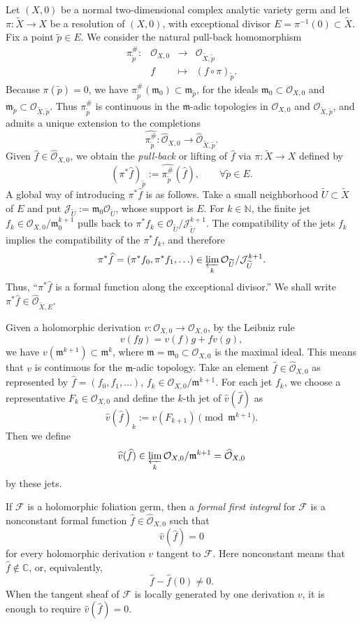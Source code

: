 \documentclass[11pt,twoside]{amsart}
\newcommand{\OO}{\mathcal O}
\newcommand{\FF}{\mathcal F}
\newcommand{\mm}{\mathfrak m}
\newcommand{\wh}{\widehat}
\newcommand{\wt}{\widetilde}
\newcommand{\CC}{\mathbb C}
\newcommand{\NN}{\mathbb N}
\theoremstyle{definition}
\begin{document}
Let $(X,0)$ be a normal two-dimensional complex analytic variety germ and let $\pi\colon\wt X\to X$ be a resolution of $(X,0)$, with exceptional divisor $E=\pi^{-1}(0)\subset\wt X$. Fix a point $\wt p\in E$. We consider the natural pull-back homomorphism
\[\begin{array}{cccc}
  \pi_{\wt p}^{\#}\colon&\OO_{X,0}&\to& \OO_{\wt X,\wt p}\\
   &f&\mapsto & (f\circ\pi)_{\wt p}.\end{array}
\]
Because $\pi(\wt p)=0$, we have $\pi_{\wt p}^{\#}(\mm_0)\subset \mm_{\wt p}$, for the ideals $\mm_0\subset\OO_{X,0}$ and $\mm_{\wt p}\subset\OO_{\wt X,\wt p}$. Thus $\pi_{\wt p}^{\#}$ is continuous in the $\mm$-adic topologies in $\OO_{X,0}$ and $\OO_{\wt X,\wt p}$, and admits a unique extension to the completions
\[
  \widehat{\pi_{\wt p}^{\#}}\colon
  \widehat{\OO}_{X,0}\to \widehat{\OO}_{\wt X,\wt p}.
\]
Given $\wh f\in\widehat{\OO}_{X,0}$, we obtain the \textit{pull-back} or lifting of $\wh f$ via $\pi\colon\wt X\to X$ defined by
\[
  (\pi^*\wh f)_{\wt p}:=\widehat{\pi_{\wt p}^{\#}}(\wh f),
  \qquad \forall\wt p\in E.
\]
A global way of introducing $\pi^*\wh f$ is as follows. Take a small
neighborhood $\wt U\subset\wt X$ of $E$ and put
$\mathcal J_{\wt U}:=\mm_0\OO_{\wt U}$, whose support is $E$. For
$k\in\NN$, the finite jet
$f_k\in \OO_{X,0}/\mm_0^{k+1}$ pulls back to
$\pi^*f_k\in \OO_{\wt U}/\mathcal J_{\wt U}^{k+1}$.
The compatibility of the jets $f_k$ implies the compatibility of the $\pi^*f_k$, and therefore
\[
  \pi^*\wh f=(\pi^*f_0,\pi^*f_1,\ldots)
  \in \varprojlim_k \OO_{\wt U}/\mathcal J_{\wt U}^{k+1}.
\]
Thus, ``$\pi^*\wh f$ is a formal function along the exceptional divisor.'' We shall write $\pi^*\wh f\in\widehat{\OO}_{\wt X,E}$.

Given a holomorphic derivation $v\colon\OO_{X,0}\to\OO_{X,0}$, by the Leibniz rule
\[
  v(fg)=v(f)g+f v(g),
\]
we have $v(\mm^{k+1})\subset \mm^k$,
where $\mm=\mm_0\subset\OO_{X,0}$ is the maximal ideal. This means that $v$ is continuous for the $\mm$-adic topology. Take an element $\wh f\in\widehat{\OO}_{X,0}$ as represented by
$\wh f=(f_0,f_1,\ldots)$,
   $f_k\in\OO_{X,0}/\mm^{k+1}$. For each jet $f_k$, we choose a representative $F_k\in\OO_{X,0}$ and define the $k$-th jet of $\widehat v(\wh f)$ as
\[
  \widehat v(\wh f)_k:=v(F_{k+1})\pmod{\mm^{k+1}}.
\]
Then we define
\[
  \widehat v(\wh f)\in \varprojlim_k \OO_{X,0}/\mm^{k+1}
  =\widehat{\OO}_{X,0}
\]
by these jets.

If $\FF$ is a holomorphic foliation germ, then a \textit{formal first
integral} for $\FF$ is a nonconstant formal function
$\wh f\in\widehat{\OO}_{X,0}$ such that
\[
\widehat v(\wh f)=0
\]
for every holomorphic derivation $v$ tangent to $\FF$.
Here nonconstant means that $\wh f\notin\CC$, or, equivalently,
\[
\wh f-\wh f(0)\neq0.
\]
When the tangent sheaf of $\FF$ is locally generated by one derivation
$v$, it is enough to require $\widehat v(\widehat f)=0$.
\end{document}
